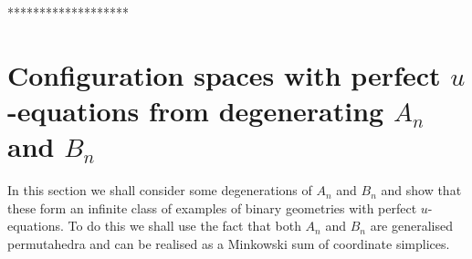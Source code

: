 \documentclass[hidelinks,12pt]{article}
\begin{document}
%


*******************

\newpage

\section{Configuration spaces with perfect $u$-equations from degenerating $A_n$ and $B_n$}
In this section we shall consider some degenerations of $A_n$ and $B_n$ and show that these form an infinite class of examples of binary geometries with perfect $u$-equations. To do this we shall use the fact that both $A_n$ and $B_n$ are generalised permutahedra and can be realised as a Minkowski sum of coordinate simplices. 
\end{document}
